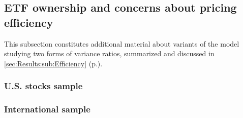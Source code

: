 {\begin{landscape}
    \subsection{ETF ownership and concerns about pricing efficiency}
    \label{app:sec:DetailedResults:Efficiency}
    This subsection constitutes additional material about variants of the model studying two forms of variance ratios, summarized and discussed in \autoref{sec:Results:sub:Efficiency} (p.\pageref{sec:Results:sub:Efficiency}).

    \subsubsection{U.S. stocks sample}
    \begin{table}[H]
      
    \end{table}
    \begin{table}[H]
      
    \end{table}
    \begin{table}[H]
      
    \end{table}
    \begin{table}[H]
      
    \end{table}

    \subsubsection{International sample}

    \begin{table}[H]
      
    \end{table}
    \begin{table}[H]
      
    \end{table}
    \begin{table}[H]
      
    \end{table}
    \begin{table}[H]
      
    \end{table}
  \end{landscape}
}
